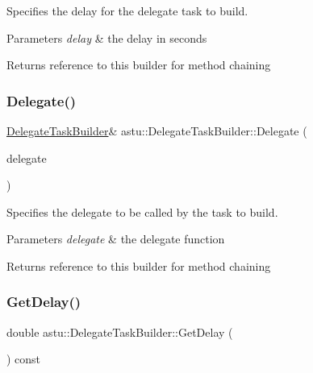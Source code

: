 Specifies the delay for the delegate task to build.


\begin{DoxyParams}{Parameters}
{\em delay} & the delay in seconds \\
\hline
\end{DoxyParams}
\begin{DoxyReturn}{Returns}
reference to this builder for method chaining 
\end{DoxyReturn}
\mbox{\label{classastu_1_1DelegateTaskBuilder_a40b80e0c6b20c1d6ea04a1c001f34dd2}} 
\subsubsection{\texorpdfstring{Delegate()}{Delegate()}}
{\footnotesize\ttfamily \hyperlink{classastu_1_1DelegateTaskBuilder}{Delegate\+Task\+Builder}\& astu\+::\+Delegate\+Task\+Builder\+::\+Delegate (\begin{DoxyParamCaption}\item[{\hyperlink{classastu_1_1DelegateTask_a74c7859178eb0889e884209d1604de4d}{Delegate\+Task\+::\+Delegate}}]{delegate }\end{DoxyParamCaption})}

Specifies the delegate to be called by the task to build.


\begin{DoxyParams}{Parameters}
{\em delegate} & the delegate function \\
\hline
\end{DoxyParams}
\begin{DoxyReturn}{Returns}
reference to this builder for method chaining 
\end{DoxyReturn}
\mbox{\label{classastu_1_1DelegateTaskBuilder_a34340f7e709dea5c18aa4f4718e1bc79}} 
\subsubsection{\texorpdfstring{Get\+Delay()}{GetDelay()}}
{\footnotesize\ttfamily double astu\+::\+Delegate\+Task\+Builder\+::\+Get\+Delay (\begin{DoxyParamCaption}{ }\end{DoxyParamCaption}) const\hspace{0.3cm}{\ttfamily [inline]}}

